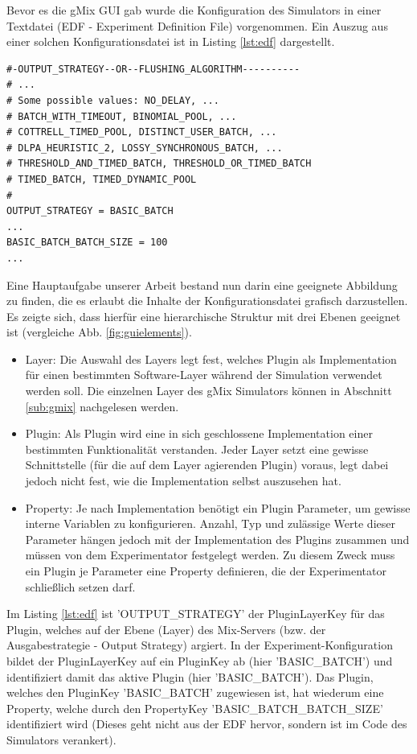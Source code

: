 \documentclass[a4paper, 11pt]{article} %
\begin{document}
Bevor es die gMix GUI gab wurde die Konfiguration des Simulators in einer Textdatei (EDF - Experiment Definition File) vorgenommen. Ein Auszug aus einer solchen Konfigurationsdatei ist in Listing \ref{lst:edf} dargestellt.

\newpage

\begin{lstlisting}[caption={Auszug aus einer Simulator Konfiguration},label=lst:edf,frame=lrtb]
#-OUTPUT_STRATEGY--OR--FLUSHING_ALGORITHM----------
# ...
# Some possible values: NO_DELAY, ... 
# BATCH_WITH_TIMEOUT, BINOMIAL_POOL, ... 
# COTTRELL_TIMED_POOL, DISTINCT_USER_BATCH, ... 
# DLPA_HEURISTIC_2, LOSSY_SYNCHRONOUS_BATCH, ...
# THRESHOLD_AND_TIMED_BATCH, THRESHOLD_OR_TIMED_BATCH 
# TIMED_BATCH, TIMED_DYNAMIC_POOL
#	
OUTPUT_STRATEGY = BASIC_BATCH
...
BASIC_BATCH_BATCH_SIZE = 100
...
\end{lstlisting}

Eine Hauptaufgabe unserer Arbeit bestand nun darin eine geeignete Abbildung zu finden, die es erlaubt die Inhalte der Konfigurationsdatei grafisch darzustellen. Es zeigte sich, dass hierfür eine hierarchische Struktur mit drei Ebenen geeignet ist (vergleiche Abb. \ref{fig:guielements}).

\begin{itemize}
	\item Layer: Die Auswahl des Layers legt fest, welches Plugin als Implementation für einen bestimmten Software-Layer während der Simulation verwendet werden soll. Die einzelnen Layer des gMix Simulators können in Abschnitt \ref{sub:gmix} nachgelesen werden. 
	\item Plugin: Als Plugin wird eine in sich geschlossene Implementation einer bestimmten Funktionalität verstanden. Jeder Layer setzt eine gewisse Schnittstelle (für die auf dem Layer agierenden Plugin) voraus, legt dabei jedoch nicht fest, wie die Implementation selbst auszusehen hat.
	\item Property: Je nach Implementation benötigt ein Plugin Parameter, um gewisse interne Variablen zu konfigurieren. Anzahl, Typ und zulässige Werte dieser Parameter hängen jedoch mit der Implementation des Plugins zusammen und müssen von dem Experimentator festgelegt werden. Zu diesem Zweck muss ein Plugin je Parameter eine Property definieren, die der Experimentator schließlich setzen darf.
\end{itemize} 

Im Listing \ref{lst:edf} ist 'OUTPUT\_STRATEGY' der PluginLayerKey für das Plugin, welches auf der Ebene (Layer) des Mix-Servers (bzw. der Ausgabestrategie - Output Strategy) argiert. In der Experiment-Konfiguration bildet der PluginLayerKey auf ein PluginKey ab (hier 'BASIC\_BATCH') und identifiziert damit das aktive Plugin (hier 'BASIC\_BATCH'). Das Plugin, welches den PluginKey 'BASIC\_BATCH' zugewiesen ist, hat wiederum eine Property, welche durch den PropertyKey 'BASIC\_BATCH\_BATCH\_SIZE' identifiziert wird (Dieses geht nicht aus der EDF hervor, sondern ist im Code des Simulators verankert).\\
\end{document}
